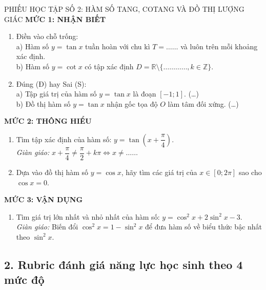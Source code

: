 \documentclass[12pt, a4paper]{article}
\begin{document}
\vspace{8pt}

\begin{pedabox}{PHIẾU HỌC TẬP SỐ 2: HÀM SỐ TANG, COTANG VÀ ĐỒ THỊ LƯỢNG GIÁC}
\textbf{MỨC 1: NHẬN BIẾT}
\begin{enumerate}[leftmargin=0.5cm]
    \item Điền vào chỗ trống:\\
    a) Hàm số $y = \tan x$ tuần hoàn với chu kì $T = \dots\dots$ và luôn \dotfill trên mỗi khoảng xác định.\\
    b) Hàm số $y = \cot x$ có tập xác định $D = \mathbb{R} \setminus \{\dots\dots\dots\dots, k \in \mathbb{Z}\}$.
    \item Đúng (Đ) hay Sai (S):\\
    a) Tập giá trị của hàm số $y = \tan x$ là đoạn $[-1; 1]$. (\dots)\\
    b) Đồ thị hàm số $y = \tan x$ nhận gốc tọa độ $O$ làm tâm đối xứng. (\dots)
\end{enumerate}

\textbf{MỨC 2: THÔNG HIỂU}
\begin{enumerate}[leftmargin=0.5cm]
    \item Tìm tập xác định của hàm số: $y = \tan\left(x + \dfrac{\pi}{4}\right)$.\\
    \textit{Giàn giáo:} $x + \dfrac{\pi}{4} \neq \dfrac{\pi}{2} + k\pi \iff x \neq \dots\dots$
    \item Dựa vào đồ thị hàm số $y = \cos x$, hãy tìm các giá trị của $x \in [0; 2\pi]$ sao cho $\cos x = 0$.
\end{enumerate}

\textbf{MỨC 3: VẬN DỤNG}
\begin{enumerate}[leftmargin=0.5cm]
    \item Tìm giá trị lớn nhất và nhỏ nhất của hàm số: $y = \cos^2 x + 2\sin^2 x - 3$.\\
    \textit{Giàn giáo:} Biến đổi $\cos^2 x = 1 - \sin^2 x$ để đưa hàm số về biểu thức bậc nhất theo $\sin^2 x$.
\end{enumerate}
\end{pedabox}

\subsection*{2. Rubric đánh giá năng lực học sinh theo 4 mức độ}
\end{document}
